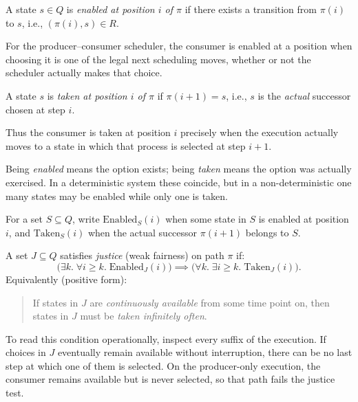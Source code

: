 \begin{definition}
\label{def:enabled}
A state $s \in Q$ is \emph{enabled at position $i$ of $\pi$} if there
exists a transition from $\pi(i)$ to $s$, i.e., $(\pi(i), s) \in R$.
\end{definition}

For the producer--consumer scheduler, the consumer is enabled at a position
when choosing it is one of the legal next scheduling moves, whether or not
the scheduler actually makes that choice.

\begin{definition}
\label{def:taken}
A state $s$ is \emph{taken at position $i$ of $\pi$} if
$\pi(i+1) = s$, i.e., $s$ is the \emph{actual} successor chosen at step $i$.
\end{definition}

Thus the consumer is taken at position \(i\) precisely when the execution
actually moves to a state in which that process is selected at step \(i+1\).

Being \emph{enabled} means the option exists; being \emph{taken} means the
option was actually exercised.  In a deterministic system these coincide,
but in a non-deterministic one many states may be enabled while only one is
taken.

For a set $S \subseteq Q$, write $\mathrm{Enabled}_S(i)$ when some state in
$S$ is enabled at position $i$, and $\mathrm{Taken}_S(i)$ when the actual
successor $\pi(i+1)$ belongs to $S$.

\begin{definition}
\label{def:justice}
A set $J \subseteq Q$ satisfies \emph{justice} (weak fairness) on path
$\pi$ if:
\[
  \bigl(\exists k.\;\forall i \geq k.\;\mathrm{Enabled}_J(i)\bigr)
  \implies
  \bigl(\forall k.\;\exists i \geq k.\;\mathrm{Taken}_J(i)\bigr).
\]
Equivalently (positive form):
\begin{quote}
If states in $J$ are \emph{continuously available} from some time point
on, then states in $J$ must be \emph{taken infinitely often}.
\end{quote}
\end{definition}

To read this condition operationally, inspect every suffix of the execution.
If choices in \(J\) eventually remain available without interruption, there
can be no last step at which one of them is selected.  On the producer-only
execution, the consumer remains available but is never selected, so that path
fails the justice test.

